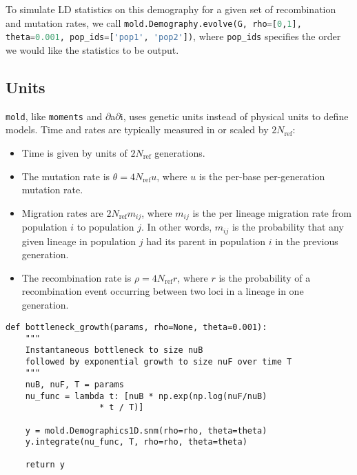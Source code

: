 \documentclass[10pt]{article}
\makeatletter
\newcommand{\dadi}{$\partial$a$\partial$i\xspace}
\newcommand{\mold}{\texttt{mold}\xspace}
\newcommand{\py}[1]{\lstinline[breaklines=true,language=Python, showstringspaces=False]@#1@}
\makeatother
\begin{document}
To simulate LD statistics on this demography for a given set of recombination and mutation rates, we call \py{mold.Demography.evolve(G, rho=[0,1], theta=0.001, pop_ids=['pop1', 'pop2'])}, where \py{pop_ids} specifies the order we would like the statistics to be output.


\subsection{Units}

\mold, like \texttt{moments} and \dadi, uses genetic units instead of physical units to define models.
Time and rates are typically measured in or scaled by $2N_\text{ref}$:
\begin{itemize}
\item Time is given by units of $2N_\text{ref}$ generations.
\item The mutation rate is $\theta=4N_\text{ref}u$, where $u$ is the per-base per-generation mutation rate.
\item Migration rates are $2N_\text{ref}m_{ij}$, where $m_{ij}$ is the per lineage migration rate from population $i$ to population $j$. In other words, $m_{ij}$ is the probability that any given lineage in population $j$ had its parent in population $i$ in the previous generation.
\item The recombination rate is $\rho=4N_\text{ref}r$, where $r$ is the probability of a recombination event occurring between two loci in a lineage in one generation.
\end{itemize}

\clearpage

\begin{lstlisting}[caption={\textbf{Bottleneck model:} At time \py{T} in the past, an equilibrium population goes through a bottleneck of depth \py{nuB}, recovering to relative size \py{nuF} through exponential growth. In all examples listed here, we need to \py{import numpy as np} and \py{import moments.LD as mold}.}, float, label={lst:bottleneck}]
def bottleneck_growth(params, rho=None, theta=0.001):
    """
    Instantaneous bottleneck to size nuB
    followed by exponential growth to size nuF over time T
    """
    nuB, nuF, T = params
    nu_func = lambda t: [nuB * np.exp(np.log(nuF/nuB) 
    			   * t / T)]

    y = mold.Demographics1D.snm(rho=rho, theta=theta)
    y.integrate(nu_func, T, rho=rho, theta=theta)

    return y
\end{lstlisting}
\end{document}

